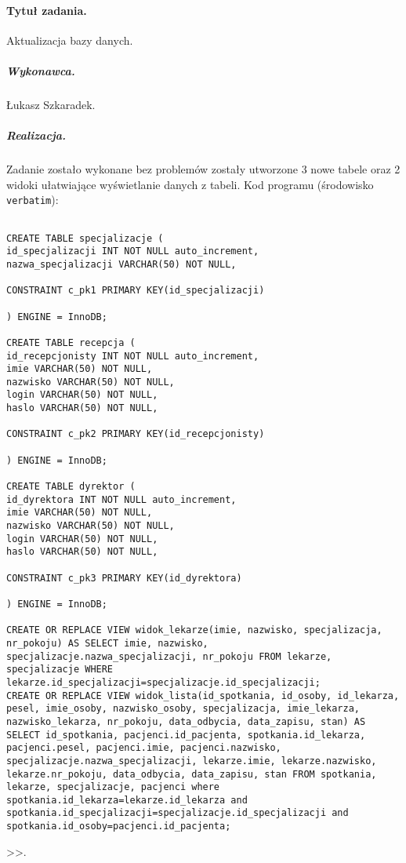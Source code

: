 \documentclass[a4paper]{article} \usepackage{polski} \usepackage[cp1250]{inputenc} \usepackage{url}
\begin{document}
\paragraph{Tytuł zadania.}  Aktualizacja bazy danych. \subparagraph{Wykonawca.} Łukasz Szkaradek. \subparagraph{Realizacja.} Zadanie zostało wykonane bez problemów zostały utworzone 3 nowe tabele oraz 2 widoki ułatwiające wyświetlanie danych z tabeli. 
\newline
\newline
Kod programu (środowisko \texttt{verbatim}): \begin{verbatim} 

CREATE TABLE specjalizacje (
id_specjalizacji INT NOT NULL auto_increment,
nazwa_specjalizacji VARCHAR(50) NOT NULL,

CONSTRAINT c_pk1 PRIMARY KEY(id_specjalizacji)

) ENGINE = InnoDB; 

CREATE TABLE recepcja (
id_recepcjonisty INT NOT NULL auto_increment,
imie VARCHAR(50) NOT NULL,
nazwisko VARCHAR(50) NOT NULL,
login VARCHAR(50) NOT NULL,
haslo VARCHAR(50) NOT NULL,

CONSTRAINT c_pk2 PRIMARY KEY(id_recepcjonisty)

) ENGINE = InnoDB; 

CREATE TABLE dyrektor (
id_dyrektora INT NOT NULL auto_increment,
imie VARCHAR(50) NOT NULL,
nazwisko VARCHAR(50) NOT NULL,
login VARCHAR(50) NOT NULL,
haslo VARCHAR(50) NOT NULL,

CONSTRAINT c_pk3 PRIMARY KEY(id_dyrektora)

) ENGINE = InnoDB; 

CREATE OR REPLACE VIEW widok_lekarze(imie, nazwisko, specjalizacja, nr_pokoju) AS SELECT imie, nazwisko, specjalizacje.nazwa_specjalizacji, nr_pokoju FROM lekarze, specjalizacje WHERE lekarze.id_specjalizacji=specjalizacje.id_specjalizacji;
CREATE OR REPLACE VIEW widok_lista(id_spotkania, id_osoby, id_lekarza, pesel, imie_osoby, nazwisko_osoby, specjalizacja, imie_lekarza, nazwisko_lekarza, nr_pokoju, data_odbycia, data_zapisu, stan) AS SELECT id_spotkania, pacjenci.id_pacjenta, spotkania.id_lekarza, pacjenci.pesel, pacjenci.imie, pacjenci.nazwisko, specjalizacje.nazwa_specjalizacji, lekarze.imie, lekarze.nazwisko, lekarze.nr_pokoju, data_odbycia, data_zapisu, stan FROM spotkania, lekarze, specjalizacje, pacjenci where spotkania.id_lekarza=lekarze.id_lekarza and spotkania.id_specjalizacji=specjalizacje.id_specjalizacji and spotkania.id_osoby=pacjenci.id_pacjenta;
 \end{verbatim}>>.
\end{document}
